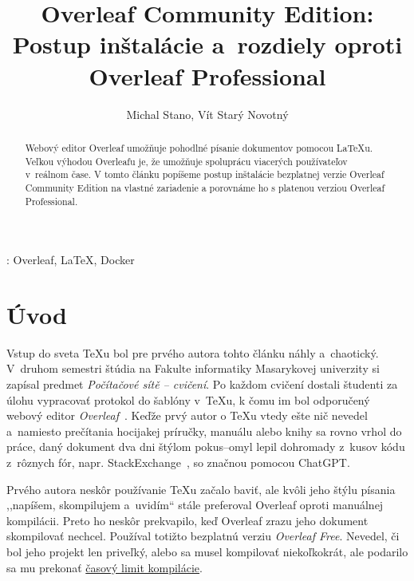 \documentclass{csbulletin}
\begin{document}
\shorthandoff{-}

\title{Overleaf Community Edition: Postup inštalácie a~rozdiely oproti Overleaf Professional}
\author{Michal Stano, Vít Starý Novotný}
\maketitle[1ex]

\begin{abstract}
Webový editor Overleaf umožňuje pohodlné písanie dokumentov pomocou \LaTeX u. Veľkou výhodou Overleafu je, že umožňuje spoluprácu viacerých používateľov v~reálnom čase.
V tomto článku popíšeme postup inštalácie bezplatnej verzie Overleaf Community Edition na vlastné zariadenie a porovnáme ho s platenou verziou Overleaf Professional.
\end{abstract}
\klucoveslova: Overleaf, \LaTeX, Docker

\section{Úvod}
Vstup do sveta \TeX u bol pre prvého autora tohto článku náhly a~chaotický. V~druhom semestri štúdia na Fakulte informatiky Masarykovej univerzity si zapísal predmet \textit{Počítačové sítě -- cvičení}. Po každom cvičení dostali študenti za úlohu vypracovať protokol do šablóny v~\TeX u, k čomu im bol odporučený webový editor \emph{Overleaf}~\cite{novotny2021overleaf}. Keďže prvý autor o \TeX u vtedy ešte nič nevedel a~namiesto prečítania hocijakej príručky, manuálu alebo knihy sa rovno vrhol do práce, daný dokument dva dni štýlom pokus--omyl lepil dohromady z~kusov kódu z~rôznych fór, napr. StackExchange~\cite{stackexchange}, so značnou pomocou ChatGPT.

Prvého autora neskôr používanie \TeX u začalo baviť, ale kvôli jeho štýlu písania ,,napíšem, skompilujem a~uvidím`` stále preferoval Overleaf oproti manuálnej kompilácii. Preto ho neskôr prekvapilo, keď Overleaf zrazu jeho dokument skompilovať nechcel. Používal totižto bezplatnú verziu \textit{Overleaf Free}. Nevedel, či bol jeho projekt len priveľký, alebo sa musel kompilovať niekoľkokrát, ale podarilo sa mu prekonať \href{https://www.overleaf.com/learn/how-to/Overleaf_plan_limits}{časový limit kompilácie}.
\end{document}
